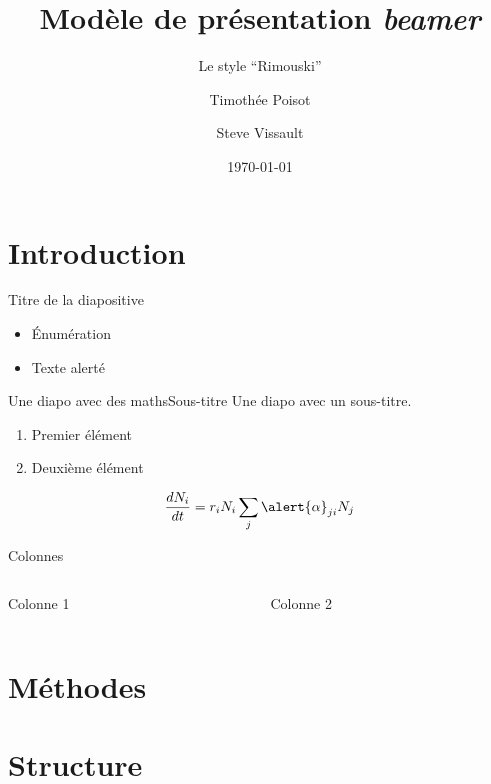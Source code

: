 \documentclass{eecslides}
\title[Modèle \emph{beamer}]{Modèle de présentation \emph{beamer}}
\subtitle{Le style ``Rimouski''}
\author[Tim \& Steve]{Timothée Poisot \and Steve Vissault}
\institute[Chaire de recherche EEC]{UQAR -- Chaire de Recherche EEC}
\date{\today}
\begin{document}
	\begin{frame}[plain]
		\titlepage
	\end{frame}

	\begin{frame}[plain]
		\tableofcontents
	\end{frame}

	\section{Introduction}

	\begin{frame}{Titre de la diapositive}
	    
		\begin{itemize}
			\item Énumération
			\item Texte \alert{alerté} 
		\end{itemize}
	
	\end{frame}

	\begin{frame}{Une diapo avec des maths}{Sous-titre}
		Une diapo avec un sous-titre.

		\begin{enumerate}
			\item Premier élément
			\item Deuxième élément
		\end{enumerate}

		$$\frac{dN_i}{dt} = r_iN_i\sum_j\alert{\alpha}_{ji}N_j$$

	\end{frame}

	\begin{frame}{Colonnes}
		
		\begin{columns}
			\begin{column}[t]{0.5\textwidth}
				Colonne 1
			\end{column}
			\begin{column}[t]{0.5\textwidth}
				Colonne 2
			\end{column}
		\end{columns}

	\end{frame}

	\section{Méthodes}
	
	\section{Structure}
\end{document}
